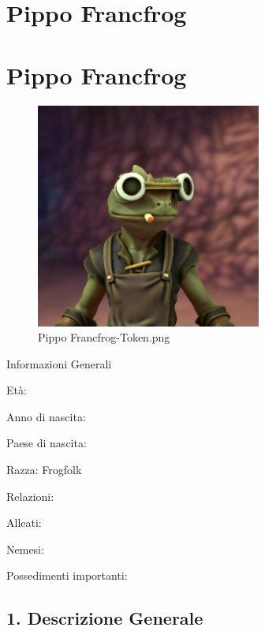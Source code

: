 \section{Pippo Francfrog}\label{pippo-francfrog}
\section{Pippo Francfrog}\label{pippo-francfrog-1}


\begin{figure}
\centering
\includegraphics{Pippo_Francfrog-Token.png}
\caption{Pippo Francfrog-Token.png}
\end{figure}

Informazioni Generali

Età:

Anno di nascita:

Paese di nascita:

Razza: Frogfolk

Relazioni:

Alleati:

Nemesi:

Possedimenti importanti:


\subsection{1. Descrizione Generale}\label{descrizione-generale}


